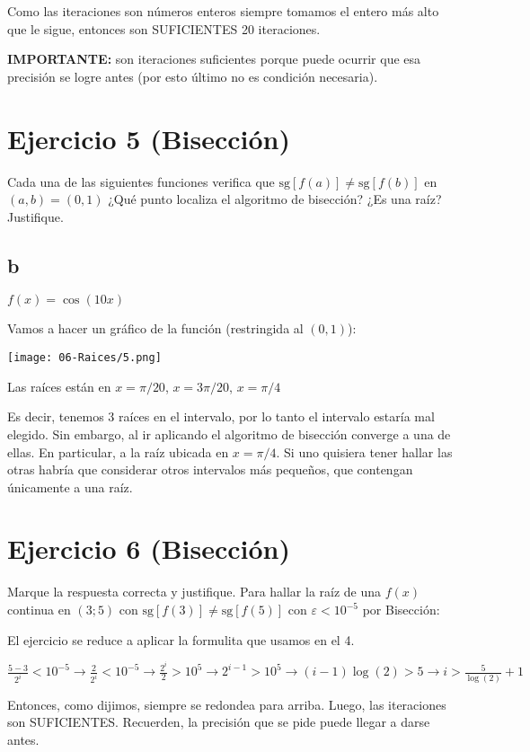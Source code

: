 \documentclass[11pt]{article}
\begin{document}
	Como las iteraciones son números enteros siempre tomamos el entero más alto que le sigue, entonces son SUFICIENTES 20 iteraciones.
	
	\textbf{IMPORTANTE:} son iteraciones suficientes porque puede ocurrir que esa precisión se logre antes (por esto último no es condición necesaria).
	
	\section{Ejercicio 5 (Bisección)}
	Cada una de las siguientes funciones verifica que $\text{sg}[f(a)]\neq\text{sg}[f(b)]$ en $(a, b)=(0, 1)$ ¿Qué punto localiza el algoritmo de bisección? ¿Es una raíz? Justifique.
	\subsection{b}
	$f(x)=\cos(10x)$
	
	Vamos a hacer un gráfico de la función (restringida al $(0, 1)$):
	
	\texttt{[image: 06-Raices/5.png]}
	
	Las raíces están en $x=\pi / 20$, $x=3\pi/20$, $x=\pi/4$
	
	Es decir, tenemos 3 raíces en el intervalo, por lo tanto el intervalo estaría mal elegido. Sin embargo, al ir aplicando el algoritmo de bisección converge a una de ellas. En particular, a la raíz ubicada en $x=\pi/4$. Si uno quisiera tener hallar las otras habría que considerar otros intervalos más pequeños, que contengan únicamente a una raíz.
	
	\section{Ejercicio 6 (Bisección)}
	Marque la respuesta correcta y justifique. Para hallar la raíz de una $f(x)$ continua en $(3;5)$ con $\text{sg}[f(3)]\neq \text{sg}[f(5)]$ con $\varepsilon < 10^{-5}$ por Bisección:
	
	El ejercicio se reduce a aplicar la formulita que usamos en el 4.
	
	$\displaystyle \frac{5-3}{2^{i}}<10^{-5} \rightarrow \frac{2}{2^{i}}<10^{-5} \rightarrow \frac{2^{i}}{2}>10^5 \rightarrow 2^{i-1}>10^5 \rightarrow (i-1)\log(2)>5 \rightarrow i > \frac{5}{\log(2)}+1$
	
	
	Entonces, como dijimos, siempre se redondea para arriba. Luego, las iteraciones son SUFICIENTES. Recuerden, la precisión que se pide puede llegar a darse antes.
	
\end{document}
